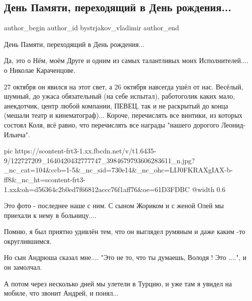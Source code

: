  
 
 
 
 
 
\subsection{День Памяти, переходящий в День рождения...}
\label{sec:27_10_2020.fb.bystrjakov_vladimir.1.pamjat_karachencov}
 
\ifcmt
 author_begin
   author_id bystrjakov_vladimir
 author_end
\fi

День Памяти, переходящий в День рождения...

Да, это о Нём, моём Друге и одним из самых талантливых моих Исполнителей.... о
Николае Караченцове. 

27 октября он явился на этот свет, а 26 октября навсегда ушёл от нас. Весёлый,
шумный, до ужаса обязательный 
(на себе испытал), работоголик каких мало, анекдотчик, центр любой компании,
ПЕВЕЦ, так и не раскрытый до конца (мешали театр и кинематограф)... Короче,
перечислять все винтики, из которых состоял Коля, всё равно, что перечислять
все награды "нашего дорогого Леонид-Ильича". 

\ifcmt
  pic https://scontent-frt3-1.xx.fbcdn.net/v/t1.6435-9/122727209_1640420432777747_3984679793606283611_n.jpg?_nc_cat=104&ccb=1-5&_nc_sid=730e14&_nc_ohc=LIJ0FKRAXgIAX-b-ff8&_nc_ht=scontent-frt3-1.xx&oh=d56364c2b0ed7f66812accc76f1aff76&oe=61D3FDBC
  @width 0.6
\fi

Это фото - последнее наше с ним. С сыном Жориком и с женой Олей мы приехали к
нему в больницу....

Помню, я был приятно удивлён тем, что он выглядел румяным и даже каким  -то
округлившимся. 

Но сын Андрюша сказал мне.... "Это не то, что ты думаешь, Володя ! Это ....", и
он замолчал.

А потом через несколько дней мы улетели в Турцию, и уже там я увидел на мобиле,
что звонит Андрей, и понял...

